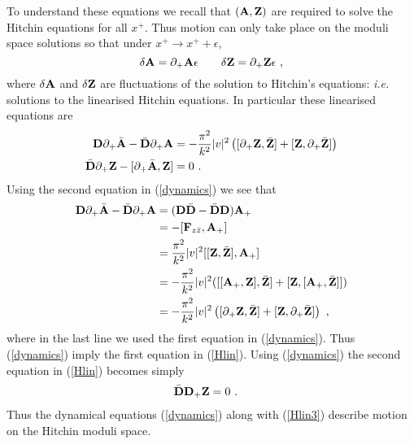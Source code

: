 \documentclass[12pt]{article}
\newcommand{\nn}{\nonumber}
\numberwithin{equation}{section}
\begin{document}
To understand these equations we recall that $({\bf A},{\bf Z})$ are required to solve the Hitchin equations for all $x^+$. Thus motion can only take place on the moduli space solutions so that under $x^+\to x^++\epsilon$, 
\begin{equation}
\delta {\bf A} = \partial_+ {\bf A} \epsilon\qquad \delta {\bf Z} = \partial_+ {\bf Z}\epsilon \ ,
\end{equation}
where $\delta {\bf A}$ and $\delta {\bf Z}$ are fluctuations of the solution to Hitchin's equations: {\it i.e.} solutions to the linearised Hitchin equations. In particular these linearised equations are
\begin{align}\label{Hlin}
{\bf D}  \partial_+  \bar {\bf A} - \bar {\bf D}   \partial_+ {\bf A} &=- \frac{\pi^2}{k^2}|v|^2\left([  \partial_+ {\bf Z}, \bar {\bf Z}]+[{\bf Z},  \partial_+\bar {\bf Z}]\right)\nn\\
\bar{\bf D}  \partial_+{\bf Z} - [  \partial_+ \bar {\bf A},{\bf Z}]&=0
\ .
\end{align}
Using the second equation  in (\ref{dynamics}) we see that\begin{align}\label{Hlin2}
{\bf D}  \partial_+  \bar {\bf A} - \bar {\bf D}   \partial_+ {\bf A} &=  ({\bf D}\bar{\bf D}-\bar {\bf D}{\bf D}){\bf A_+}\nn\\
& =  -[{\bf F}_{z\bar z},{\bf A}_+]\nn\\
&= \frac{\pi^2}{k^2}|v|^2[[{\bf Z},\bar {\bf Z}],{\bf A}_+]\nn\\
& = -\frac{\pi^2}{k^2}|v|^2([[{\bf A}_+, {\bf Z}],\bar {\bf Z}]+[{\bf Z},[{\bf A}_+,\bar {\bf Z}] ])\nn\\
&=- \frac{\pi^2}{k^2}|v|^2\left([  \partial_+ {\bf Z}, \bar {\bf Z}]+[{\bf Z},  \partial_+\bar {\bf Z}]\right)\ ,
 \end{align}
 where in the last line we used the first equation in  (\ref{dynamics}). 
Thus  (\ref{dynamics}) imply the first equation in (\ref{Hlin}). Using  (\ref{dynamics}) the second equation in (\ref{Hlin}) becomes simply
\begin{align} \label{Hlin3}
\bar{\bf D}{\bf D}_+{\bf Z} & = 0\ .
\end{align}
Thus the dynamical equations (\ref{dynamics}) along with (\ref{Hlin3}) describe motion on the Hitchin moduli space.
\end{document}
